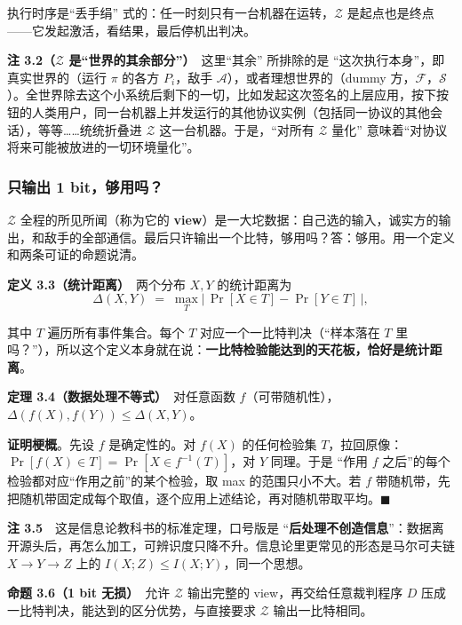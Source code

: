 执行时序是“丢手绢”
式的：任一时刻只有一台机器在运转，$\mathcal{Z}$ 是起点也是终点------它发起激活，看结果，最后停机出判决。

\textbf{注 3.2（$\mathcal{Z}$ 是“世界的其余部分”）}　这里“其余”
所排除的是
“这次执行本身”，即真实世界的（运行 $\pi$ 的各方 $P_i$，敌手 $\mathcal{A}$），或者理想世界的（dummy
方，$\mathcal{F}$，$\mathcal{S}$）。全世界除去这个小系统后剩下的一切，比如发起这次签名的上层应用，按下按钮的人类用户，同一台机器上并发运行的其他协议实例（包括同一协议的其他会话），等等\ldots\ldots 统统折叠进 $\mathcal{Z}$ 这一台机器。于是，“对所有 $\mathcal{Z}$ 量化”
意味着“对协议将来可能被放进的一切环境量化”。

\subsubsection{只输出 1 bit，够用吗？}

$\mathcal{Z}$ 全程的所见所闻（称为它的
\textbf{view}）是一大坨数据：自己选的输入，诚实方的输出，和敌手的全部通信。最后只许输出一个比特，够用吗？答：够用。用一个定义和两条可证的命题说清。

\textbf{定义 3.3（统计距离）}　两个分布 $X, Y$ 的统计距离为
\begin{equation}\label{eq:uc-framework:2}
\Delta(X,Y) \;=\; \max_T \bigl|\, \Pr[X\in T] - \Pr[Y\in T] \,\bigr|,
\end{equation}

其中 $T$ 遍历所有事件集合。每个 $T$ 对应一个一比特判决（“样本落在 $T$ 里吗？”），所以这个定义本身就在说：\textbf{一比特检验能达到的天花板，恰好是统计距离}。

\textbf{定理
3.4（数据处理不等式）}　对任意函数 $f$（可带随机性），$\Delta(f(X), f(Y)) \le \Delta(X,Y)$。

\textbf{证明梗概}。先设 $f$ 是确定性的。对 $f(X)$ 的任何检验集 $T$，拉回原像：$\Pr[f(X)\in T] = \Pr[X \in f^{-1}(T)]$，对 $Y$ 同理。于是
“作用 $f$ 之后”的每个检验都对应“作用之前”的某个检验，取 max
的范围只小不大。若 $f$ 带随机带，先把随机带固定成每个取值，逐个应用上述结论，再对随机带取平均。$\blacksquare$

\textbf{注 3.5}　这是信息论教科书的标准定理，口号版是
“\textbf{后处理不创造信息}”：数据离开源头后，再怎么加工，可辨识度只降不升。信息论里更常见的形态是马尔可夫链 $X \to Y \to Z$ 上的 $I(X;Z) \le I(X;Y)$，同一个思想。

\textbf{命题 3.6（1 bit 无损）}　允许 $\mathcal{Z}$ 输出完整的
view，再交给任意裁判程序 $D$ 压成一比特判决，能达到的区分优势，与直接要求 $\mathcal{Z}$ 输出一比特相同。

